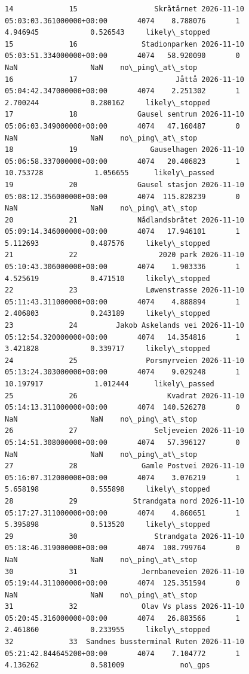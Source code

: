 \documentclass[11pt]{article}
\begin{document}
\begin{Verbatim}[commandchars=\\\{\}]
14             15                  Skråtårnet 2026-11-10 05:03:03.361000000+00:00       4074    8.788076       1         4.946945            0.526543     likely\_stopped
15             16               Stadionparken 2026-11-10 05:03:51.334000000+00:00       4074   58.920090       0              NaN                 NaN    no\_ping\_at\_stop
16             17                       Jåttå 2026-11-10 05:04:42.347000000+00:00       4074    2.251302       1         2.700244            0.280162     likely\_stopped
17             18              Gausel sentrum 2026-11-10 05:06:03.349000000+00:00       4074   47.160487       0              NaN                 NaN    no\_ping\_at\_stop
18             19                 Gauselhagen 2026-11-10 05:06:58.337000000+00:00       4074   20.406823       1        10.753728            1.056655      likely\_passed
19             20              Gausel stasjon 2026-11-10 05:08:12.356000000+00:00       4074  115.828239       0              NaN                 NaN    no\_ping\_at\_stop
20             21              Nådlandsbråtet 2026-11-10 05:09:14.346000000+00:00       4074   17.946101       1         5.112693            0.487576     likely\_stopped
21             22                   2020 park 2026-11-10 05:10:43.306000000+00:00       4074    1.903336       1         4.525619            0.471510     likely\_stopped
22             23                Løwenstrasse 2026-11-10 05:11:43.311000000+00:00       4074    4.888894       1         2.406803            0.243189     likely\_stopped
23             24         Jakob Askelands vei 2026-11-10 05:12:54.320000000+00:00       4074   14.354816       1         3.421828            0.339717     likely\_stopped
24             25                Porsmyrveien 2026-11-10 05:13:24.303000000+00:00       4074    9.029248       1        10.197917            1.012444      likely\_passed
25             26                     Kvadrat 2026-11-10 05:14:13.311000000+00:00       4074  140.526278       0              NaN                 NaN    no\_ping\_at\_stop
26             27                  Seljeveien 2026-11-10 05:14:51.308000000+00:00       4074   57.396127       0              NaN                 NaN    no\_ping\_at\_stop
27             28               Gamle Postvei 2026-11-10 05:16:07.312000000+00:00       4074    3.076219       1         5.658198            0.555898     likely\_stopped
28             29             Strandgata nord 2026-11-10 05:17:27.311000000+00:00       4074    4.860651       1         5.395898            0.513520     likely\_stopped
29             30                  Strandgata 2026-11-10 05:18:46.319000000+00:00       4074  108.799764       0              NaN                 NaN    no\_ping\_at\_stop
30             31               Jernbaneveien 2026-11-10 05:19:44.311000000+00:00       4074  125.351594       0              NaN                 NaN    no\_ping\_at\_stop
31             32               Olav Vs plass 2026-11-10 05:20:45.316000000+00:00       4074   26.883566       1         2.461860            0.233955     likely\_stopped
32             33  Sandnes bussterminal Ruten 2026-11-10 05:21:42.844645200+00:00       4074    7.104772       1         4.136262            0.581009             no\_gps
    \end{Verbatim}
\end{document}

